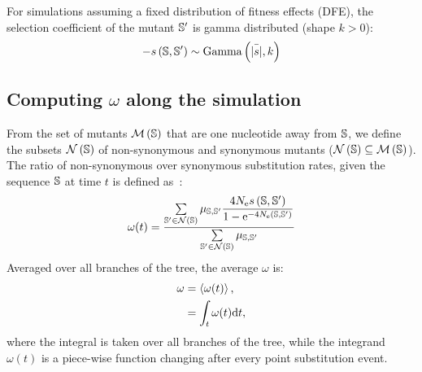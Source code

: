 For simulations assuming a fixed distribution of fitness effects ({DFE}), the selection coefficient of the mutant $\mathbb{S}'$ is gamma distributed (shape $k > 0$):
\begin{equation}
    - s \left( \mathbb{S},\mathbb{S}'\right) \sim \text{Gamma} \left( \bar{|s|}, k \right)
\end{equation}

\subsection{Computing $\omega$ along the simulation}
From the set of mutants $\mathcal{M}\left(\mathbb{S}\right)$ that are one nucleotide away from $\mathbb{S}$, we define the subsets $\mathcal{N}\left(\mathbb{S}\right)$ of {non-synonymous} and {synonymous} mutants ($\mathcal{N}\left(\mathbb{S}\right) \subseteq \mathcal{M}\left(\mathbb{S}\right)$).
The ratio of {non-synonymous} over {synonymous} {substitution} rates, given the sequence $\mathbb{S}$ at time $t$ is defined as~\citep{Spielman2015, DosReis2015, Jones2016}:
\begin{equation}
    \omega(t) = \dfrac{\sum\limits_{\mathbb{S}' \in \mathcal{N}\left(\mathbb{S}\right)} \mu_{\mathbb{S}, \mathbb{S}'} \dfrac{4 N_{\text{e}} s \left( \mathbb{S},\mathbb{S}'\right)}{{1 - \text{e}^{-4 N_{\text{e}} \left( \mathbb{S},\mathbb{S}'\right)} }}}{\sum\limits_{\mathbb{S}' \in \mathcal{N}\left(\mathbb{S}\right)} \mu_{\mathbb{S}, \mathbb{S}'}}
\end{equation}
Averaged over all branches of the tree, the average $\omega$ is:
\begin{align}
    \omega & = \left\langle \omega(t) \right\rangle, \\
    & = \int_{t} \omega (t) \mathrm{d} t,
\end{align}
where the integral is taken over all branches of the tree, while the integrand $\omega (t)$ is a piece-wise function changing after every point {substitution} event.
